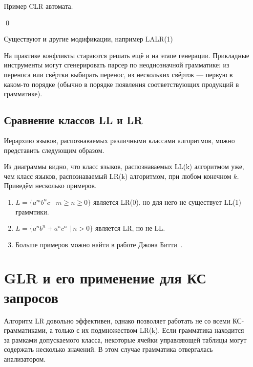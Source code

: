 \begin{example}
Пример CLR автомата.

\begin{center}
  
\end{center}
\qed
\end{example}


Существуют и другие модификации, например LALR(1)

На практике конфликты стараются решать ещё и на этапе генерации.
Прикладные инструменты могут сгенерировать парсер по неоднозначной грамматике: из переноса или свёртки выбирать перенос, из нескольких свёрток --- первую в каком-то порядке (обычно в порядке появления соответствующих продукций в грамматике).

\subsection{Сравнение классов LL и LR}

Иерархию языков, распознаваемых различными классами алгоритмов, можно представить следующим  образом.

\begin{center}
  
\end{center}

Из диаграммы видно, что класс языков, распознаваемых LL(k) алгоритмом уже, чем класс языков, распознаваемый LR(k) алгоритмом, при любом конечном $k$. Приведём несколько примеров.
\begin{enumerate}
\item $L = \{a^mb^nc \mid m \geq n \geq 0\} $ является LR(0), но для него не существует LL(1) граммтики.
\item $L = \{ a^n b^n + a^n c^n \mid n > 0\}$ является LR, но не LL.
\item Больше примеров можно найти в работе Джона Битти~\cite{BEATTY1980193}.
\end{enumerate}

\section{GLR и его применение для КС запросов}

Алгоритм LR довольно эффективен, однако позволяет работать не со всеми КС-грамматиками, а только с их подмножеством LR(k). Если грамматика находится за рамками допускаемого класса, некоторые ячейки управляющей таблицы могут содержать несколько значений. В этом случае грамматика отвергалась анализатором.

